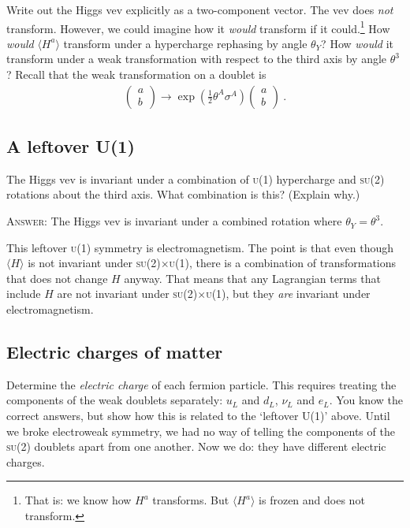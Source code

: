\documentclass[12pt]{article}
\newcommand{\acro}[1]{\textsc{\MakeLowercase{#1}}}
\numberwithin{equation}{section}    %
\begin{document}
Write out the Higgs vev explicitly as a two-component vector. The vev does \emph{not} transform. However, we could imagine how it \emph{would} transform if it could.\footnote{That is: we know how $H^a$ transforms. But $\langle H^a\rangle$ is frozen and does not transform.} How \emph{would} $\langle H^a\rangle$ transform under a hypercharge rephasing by angle $\theta_Y$? How \emph{would} it transform under a weak transformation with respect to the third axis by angle $\theta^3$? Recall that the weak transformation on a doublet is
\begin{align}
	\begin{pmatrix}
	a\\
	b
	\end{pmatrix}
	\to 
	\exp\left(\frac{1}{2}\theta^A \sigma^A\right)
	\begin{pmatrix}
	a\\
	b
	\end{pmatrix} \ .
\end{align}

\subsection{A leftover U(1)}

The Higgs vev is invariant under a combination of \acro{U(1)} hypercharge and \acro{SU(2)} rotations about the third axis. What combination is this? (Explain why.)

\textsc{Answer}: The Higgs vev is invariant under a combined rotation where $\theta_Y = \theta^3$.

This leftover \acro{U(1)} symmetry is electromagnetism. The point is that even though $\langle H \rangle$ is not invariant under \acro{SU(2)}$\times$\acro{U(1)}, there is a combination of transformations that does not change $H$ anyway. That means that any Lagrangian terms that include $H$ are not invariant under \acro{SU(2)}$\times$\acro{U(1)}, but they \emph{are} invariant under electromagnetism.

\subsection{Electric charges of matter}

Determine the \emph{electric charge} of each fermion particle. This requires treating the components of the weak doublets separately: $u_L$ and $d_L$, $\nu_L$ and $e_L$. You know the correct answers, but show how this is related to the `leftover U(1)' above. Until we broke electroweak symmetry, we had no way of telling the components of the \acro{SU(2)} doublets apart from one another. Now we do: they have different electric charges.
\end{document}
